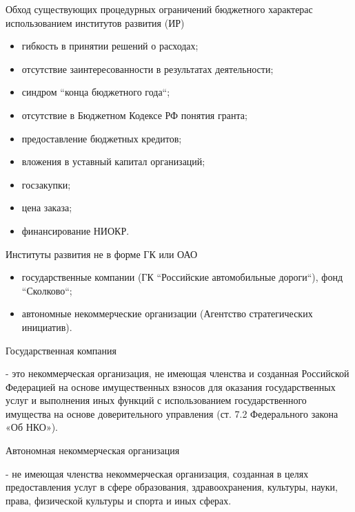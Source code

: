 \documentclass[_Venture_p3.tex]{subfiles}
\begin{document}
\begin{frame}{Обход существующих процедурных ограничений бюджетного характера}{с использованием институтов развития (ИР)}
\begin{itemize}
	\item гибкость в принятии решений о расходах;
	\item отсутствие заинтересованности в результатах деятельности;	\item синдром ``конца бюджетного года``;
	
	\pagebreak
	\item отсутствие в Бюджетном Кодексе РФ понятия гранта;
	\item предоставление бюджетных кредитов;
	\item вложения в уставный капитал организаций;

	\pagebreak
	\item госзакупки;
	\item цена заказа;
	\item финансирование НИОКР.
\end{itemize}
\end{frame}



\begin{frame}{Институты развития не в форме ГК или ОАО}{}
\begin{itemize}
	\item государственные компании (ГК ``Российские автомобильные дороги``), фонд ``Сколково``;
	\item автономные некоммерческие организации (Агентство стратегических инициатив).
\end{itemize}
\end{frame}

\begin{frame}{Государственная компания}
\begin{block}{}
	\quad
	- это некоммерческая организация, не имеющая членства и созданная Российской Федерацией на основе имущественных взносов для оказания государственных услуг и выполнения иных функций с использованием государственного имущества на основе доверительного управления (ст. 7.2 Федерального закона «Об НКО»).
\end{block}
\end{frame}

\begin{frame}{Автономная некоммерческая организация}
\begin{block}{}
	\quad
	- не имеющая членства некоммерческая организация, созданная в целях предоставления услуг в сфере образования, здравоохранения, культуры, науки, права, физической культуры и спорта и иных сферах.
\end{block}
\end{frame}
\end{document}
